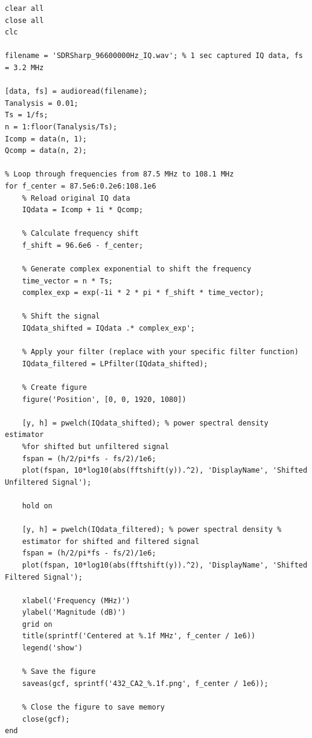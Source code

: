 \documentclass{article}
\begin{document}
\begin{verbatim}
clear all
close all
clc

filename = 'SDRSharp_96600000Hz_IQ.wav'; % 1 sec captured IQ data, fs = 3.2 MHz

[data, fs] = audioread(filename);
Tanalysis = 0.01;
Ts = 1/fs;
n = 1:floor(Tanalysis/Ts);
Icomp = data(n, 1);
Qcomp = data(n, 2);

% Loop through frequencies from 87.5 MHz to 108.1 MHz
for f_center = 87.5e6:0.2e6:108.1e6
    % Reload original IQ data
    IQdata = Icomp + 1i * Qcomp;
    
    % Calculate frequency shift
    f_shift = 96.6e6 - f_center;
    
    % Generate complex exponential to shift the frequency
    time_vector = n * Ts;
    complex_exp = exp(-1i * 2 * pi * f_shift * time_vector);
    
    % Shift the signal
    IQdata_shifted = IQdata .* complex_exp';
    
    % Apply your filter (replace with your specific filter function)
    IQdata_filtered = LPfilter(IQdata_shifted);
    
    % Create figure
    figure('Position', [0, 0, 1920, 1080])
    
    [y, h] = pwelch(IQdata_shifted); % power spectral density estimator 
    %for shifted but unfiltered signal
    fspan = (h/2/pi*fs - fs/2)/1e6;
    plot(fspan, 10*log10(abs(fftshift(y)).^2), 'DisplayName', 'Shifted Unfiltered Signal');
    
    hold on
    
    [y, h] = pwelch(IQdata_filtered); % power spectral density %
    estimator for shifted and filtered signal
    fspan = (h/2/pi*fs - fs/2)/1e6;
    plot(fspan, 10*log10(abs(fftshift(y)).^2), 'DisplayName', 'Shifted Filtered Signal');
    
    xlabel('Frequency (MHz)')
    ylabel('Magnitude (dB)')
    grid on
    title(sprintf('Centered at %.1f MHz', f_center / 1e6))
    legend('show')
    
    % Save the figure
    saveas(gcf, sprintf('432_CA2_%.1f.png', f_center / 1e6));
    
    % Close the figure to save memory
    close(gcf);
end
\end{verbatim}
\end{document}
